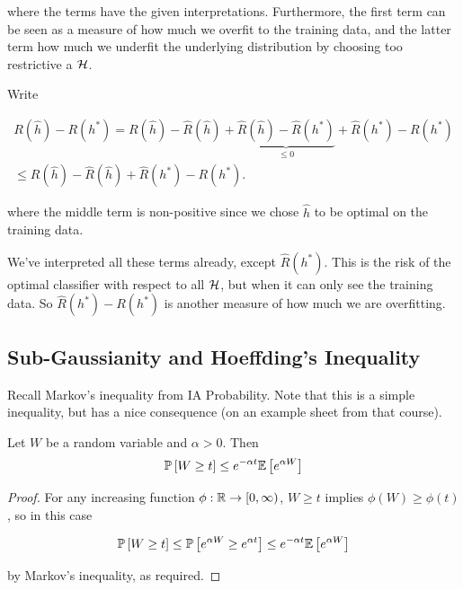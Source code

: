 \documentclass[11pt]{scrartcl}
\begin{document}
where the terms have the given interpretations. Furthermore, the first term can be seen as a measure of how much we overfit to the training data, and the latter term how much we underfit the underlying distribution by choosing too restrictive a $\mathcal{H}$.




Write 

\begin{align}
    R(\hat{h}) - R(h^*) = R(\hat{h}) - \hat{R}(\hat{h}) + \underbrace{\hat{R}(\hat{h}) - \hat{R}(h^*)}_{\le 0} + \hat{R}(h^*) - R(h^*) \\
    \le R(\hat{h}) - \hat{R}(\hat{h}) + \hat{R}(h^*) - R(h^*).
\label{FineForFinite}
\end{align}

where the middle term is non-positive since we chose $\hat{h}$ to be optimal on the training data.

We've interpreted all these terms already, except $\hat{R}(h^*)$. This is the risk of the optimal classifier with respect to all $\mathcal{H}$, but when it can only see the training data. So $\hat{R}(h^*) - R(h^*)$ is another measure of how much we are overfitting.

\subsection{Sub-Gaussianity and Hoeffding's Inequality}

Recall Markov's inequality from IA Probability. Note that this is a simple inequality, but has a nice consequence (on an example sheet from that course).

\begin{theorem}
Let $W$ be a random variable and $\alpha > 0$. Then
\begin{equation}
    \mathbb{P} \left[ W \ge t \right] \le e^{- \alpha t} \mathbb{E} \left[ e^{\alpha W} \right]
\label{L2 Chernoff}
\end{equation}

\begin{proof}

For any increasing function $\phi : \mathbb R \rightarrow [0, \infty)$, $W \ge t$ implies $\phi(W) \ge \phi(t)$, so in this case

\begin{equation}
    \mathbb{P} \left[ W \ge t \right] \le \mathbb{P} \left[ e^{\alpha W} \ge e^{\alpha t} \right] \le e^{- \alpha t} \mathbb{E} \left[ e^{\alpha W} \right]
\end{equation}

by Markov's inequality, as required.
\end{proof}
\end{theorem}
\end{document}

